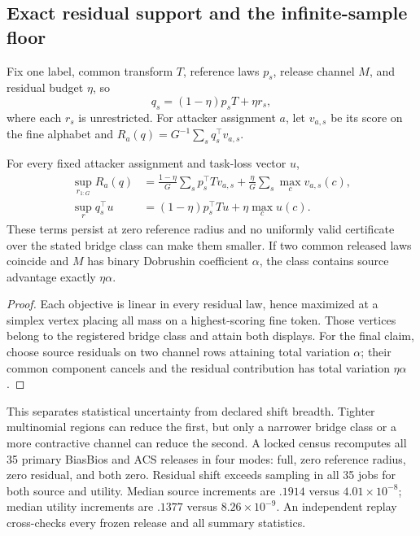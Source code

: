 \subsection{Exact residual support and the infinite-sample floor}

Fix one label, common transform $T$, reference laws $p_s$, release channel
$M$, and residual budget $\eta$, so
\[
q_s=(1-\eta)p_sT+\eta r_s,
\]
where each $r_s$ is unrestricted. For attacker assignment $a$, let
$v_{a,s}$ be its score on the fine alphabet and
$R_a(q)=G^{-1}\sum_s q_s^\top v_{a,s}$.

\begin{theorem}
For every fixed attacker assignment and task-loss vector $u$,
\begin{align}
\sup_{r_{1:G}}R_a(q)
&=\frac{1-\eta}{G}\sum_s p_s^\top Tv_{a,s}
 +\frac{\eta}{G}\sum_s\max_c v_{a,s}(c),\\
\sup_r q_s^\top u
&=(1-\eta)p_s^\top Tu+\eta\max_c u(c).
\end{align}
These terms persist at zero reference radius and no uniformly valid
certificate over the stated bridge class can make them smaller. If two
common released laws coincide and $M$ has binary Dobrushin coefficient
$\alpha$, the class contains source advantage exactly $\eta\alpha$.
\end{theorem}

\begin{proof}
Each objective is linear in every residual law, hence maximized at a simplex
vertex placing all mass on a highest-scoring fine token. Those vertices belong
to the registered bridge class and attain both displays. For the final claim,
choose source residuals on two channel rows attaining total variation
$\alpha$; their common component cancels and the residual contribution has
total variation $\eta\alpha$.
\end{proof}

This separates statistical uncertainty from declared shift breadth. Tighter
multinomial regions can reduce the first, but only a narrower bridge class or
a more contractive channel can reduce the second. A locked census recomputes
all 35 primary BiasBios and ACS releases in four modes: full, zero reference
radius, zero residual, and both zero. Residual shift exceeds sampling in all
35 jobs for both source and utility. Median source increments are $.1914$
versus $4.01\times10^{-8}$; median utility increments are $.1377$ versus
$8.26\times10^{-9}$. An independent replay cross-checks every frozen release
and all summary statistics.

